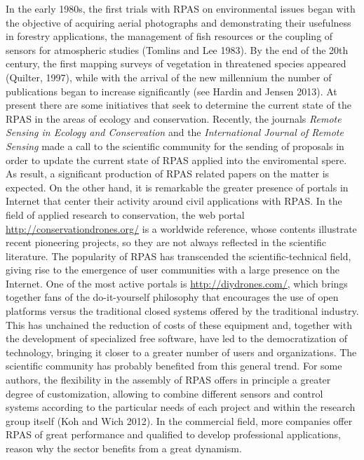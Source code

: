 \documentclass[]{interact}
\theoremstyle{plain}%
\theoremstyle{definition}
\theoremstyle{remark}
\begin{document}
In the early 1980s, the first trials with RPAS on environmental issues
began with the objective of acquiring aerial photographs and
demonstrating their usefulness in forestry applications, the management
of fish resources or the coupling of sensors for atmospheric studies
(Tomlins and Lee 1983). By the end of the 20th century, the first
mapping surveys of vegetation in threatened species appeared (Quilter,
1997), while with the arrival of the new millennium the number of
publications began to increase significantly (see Hardin and Jensen
2013). At present there are some initiatives that seek to determine the
current state of the RPAS in the areas of ecology and conservation.
Recently, the journals \emph{Remote Sensing in Ecology and Conservation}
and the \emph{International Journal of Remote Sensing} made a call to
the scientific community for the sending of proposals in order to update
the current state of RPAS applied into the enviromental spere. As
result, a significant production of RPAS related papers on the matter is
expected. On the other hand, it is remarkable the greater presence of
portals in Internet that center their activity around civil applications
with RPAS. In the field of applied research to conservation, the web
portal \url{http://conservationdrones.org/} is a worldwide reference,
whose contents illustrate recent pioneering projects, so they are not
always reflected in the scientific literature. The popularity of RPAS
has transcended the scientific-technical field, giving rise to the
emergence of user communities with a large presence on the Internet. One
of the most active portals is \url{http://diydrones.com/}, which brings
together fans of the do-it-yourself philosophy that encourages the use
of open platforms versus the traditional closed systems offered by the
traditional industry. This has unchained the reduction of costs of these
equipment and, together with the development of specialized free
software, have led to the democratization of technology, bringing it
closer to a greater number of users and organizations. The scientific
community has probably benefited from this general trend. For some
authors, the flexibility in the assembly of RPAS offers in principle a
greater degree of customization, allowing to combine different sensors
and control systems according to the particular needs of each project
and within the research group itself (Koh and Wich 2012). In the
commercial field, more companies offer RPAS of great performance and
qualified to develop professional applications, reason why the sector
benefits from a great dynamism.
\end{document}
